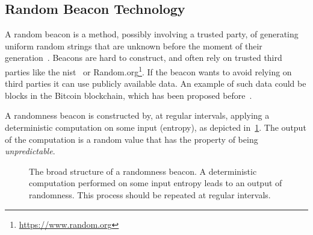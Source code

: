 \subsection{Random Beacon Technology}
A random beacon is a method, possibly involving a trusted party, of generating uniform random strings that are unknown before the moment of their generation~\cite{andrychowicz2014distributed}.
Beacons are hard to construct, and often rely on trusted third parties like the \acrfull{nist}~\cite{nistbeacon} or Random.org\footnote{\url{https://www.random.org}}.
If the beacon wants to avoid relying on third parties it can use publicly available data.
An example of such data could be blocks in the Bitcoin blockchain, which has been proposed before~\cite{bonneau2015bitcoin}.

A randomness beacon is constructed by, at regular intervals, applying a deterministic computation on some input (entropy), as depicted in~\cref{fig:beacon}. The output of the computation is a random value that has the property of being \emph{unpredictable}.

\begin{figure}[htb]
    \centering
    \caption{The broad structure of a randomness beacon. A deterministic computation performed on some input entropy leads to an output of randomness. This process should be repeated at regular intervals.}\label{fig:beacon}
\end{figure}
